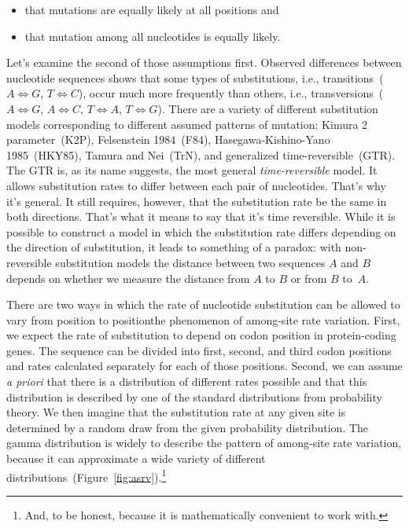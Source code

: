 \documentclass[12pt]{article}
\begin{document}
\begin{itemize}

\item that mutations are equally likely at all positions and

\item that mutation among all nucleotides is equally likely.

\end{itemize}

Let's examine the second of those assumptions first. Observed
differences between nucleotide sequences shows that some types of
substitutions, i.e., transitions~($A \iff G$, $T \iff C$), occur much
more frequently than others, i.e., transversions~($A \iff G$, $A \iff
C$, $T \iff A$, $T \iff G$). There are a variety of different
substitution models corresponding to different assumed patterns of
mutation: Kimura 2 parameter~(K2P), Felsenstein 1984~(F84),
Hasegawa-Kishino-Yano 1985~(HKY85), Tamura and Nei~(TrN), and
generalized time-reversible~(GTR). The GTR is, as its name suggests,
the most general {\it time-reversible\/} model. It allows substitution
rates to differ between each pair of nucleotides. That's why it's
general. It still requires, however, that the substitution rate be the
same in both directions. That's what it means to say that it's time
reversible. While it is possible to construct a model in which the
substitution rate differs depending on the direction of substitution,
it leads to something of a paradox: with non-reversible substitution
models the distance between two sequences $A$ and $B$ depends on
whether we measure the distance from $A$ to $B$ or from $B$ to~$A$.

There are two ways in which the rate of nucleotide substitution can be
allowed to vary from position to position{\dash}the phenomenon of
among-site rate variation. First, we expect the rate of substitution
to depend on codon position in protein-coding genes. The sequence can
be divided into first, second, and third codon positions and rates
calculated separately for each of those positions. Second, we can
assume {\it a priori\/} that there is a distribution of different
rates possible and that this distribution is described by one of the
standard distributions from probability theory. We then imagine that
the substitution rate at any given site is determined by a random draw
from the given probability distribution. The gamma distribution is
widely to describe the pattern of among-site rate variation, because
it can approximate a wide variety of different
distributions~(Figure~\ref{fig:asrv}).\footnote{And, to be honest,
  because it is mathematically convenient to work
  with.}
\end{document}

